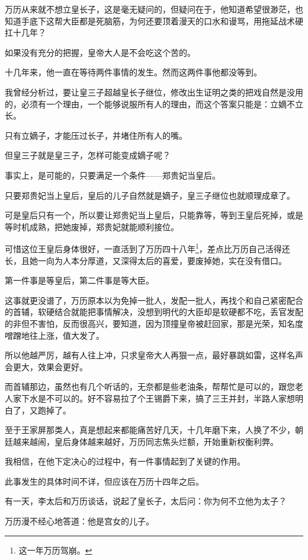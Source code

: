 \begin{multicols}{\theparacolNo}
		万历从来就不想立皇长子，这是毫无疑问的，但疑问在于，他知道希望很渺茫，也知道手底下这帮大臣都是死脑筋，为何还要顶着漫天的口水和谩骂，用拖延战术硬扛十几年？

		如果没有充分的把握，皇帝大人是不会吃这个苦的。

		十几年来，他一直在等待两件事情的发生。然而这两件事他都没等到。

		我曾经分析过，要让皇三子超越皇长子继位，修改出生证明之类的把戏自然是没用的，必须有一个理由，一个能够说服所有人的理由，而这个答案只能是：立嫡不立长。

		只有立嫡子，才能压过长子，并堵住所有人的嘴。

		但皇三子就是皇三子，怎样可能变成嫡子呢？

		事实上，是可能的，只要满足一个条件——郑贵妃当皇后。

		只要郑贵妃当上皇后，皇后的儿子自然就是嫡子，皇三子继位也就顺理成章了。

		可是皇后只有一个，所以要让郑贵妃当上皇后，只能靠等，等到王皇后死掉，或是等时机成熟，把她废掉，郑贵妃就能顺利接位。

		可惜这位王皇后身体很好，一直活到了万历四十八年\footnote{这一年万历驾崩。}，差点比万历自己活得还长，且她一向为人本分厚道，又深得太后的喜爱，要废掉她，实在没有借口。

		第一件事是等皇后，第二件事是等大臣。

		这事就更没谱了，万历原本以为免掉一批人，发配一批人，再找个和自己紧密配合的首辅，软硬结合就能把事情解决，没想到明代的大臣却是软硬都不吃，丢官发配的非但不害怕，反而很高兴，要知道，因为顶撞皇帝被赶回家，那是光荣，知名度噌蹭地往上涨，值大发了。

		所以他越严厉，越有人往上冲，只求皇帝大人再狠一点，最好暴跳如雷，这样名声会更大，效果会更好。

		而首辅那边，虽然也有几个听话的，无奈都是些老油条，帮帮忙是可以的，跟您老人家下水是不可以的。好不容易拉了个王锡爵下来，搞了三王并封，半路人家想明白了，又跑掉了。

		至于王家屏那类人，真是想起来都能痛苦好几天，十几年磨下来，人换了不少，朝廷越来越闹，皇后身体越来越好，万历同志焦头烂额，开始重新权衡利弊。

		我相信，在他下定决心的过程中，有一件事情起到了关键的作用。

		此事发生的具体时间不详，但应该在万历十四年之后。

		有一天，李太后和万历谈话，说起了皇长子，太后问：你为何不立他为太子？

		万历漫不经心地答道：他是宫女的儿子。


\end{multicols}
